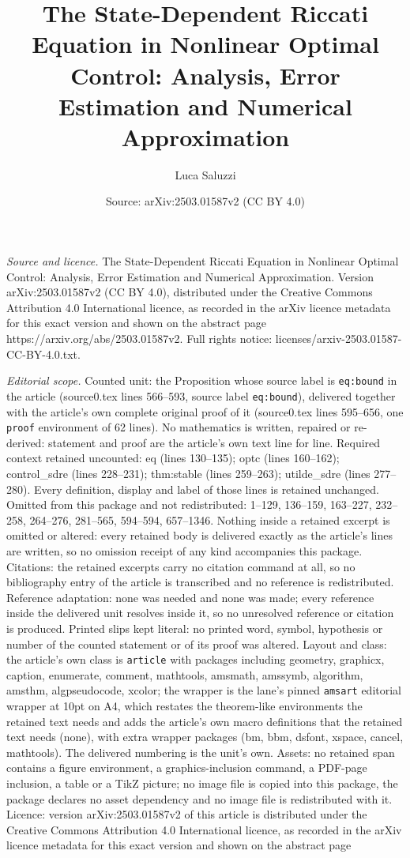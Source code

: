 \documentclass[10pt,a4paper]{amsart}
\title[The State-Dependent Riccati Equation in Nonlinear Optimal Co]{The State-Dependent Riccati Equation in Nonlinear Optimal Control: Analysis, Error Estimation and Numerical Approximation}
\author{Luca Saluzzi}
\date{Source: arXiv:2503.01587v2 (CC BY 4.0)}
\begin{document}
\maketitle

\noindent\emph{Source and licence.} The State-Dependent Riccati Equation in Nonlinear Optimal Control: Analysis, Error Estimation and Numerical Approximation. Version arXiv:2503.01587v2 (CC BY 4.0), distributed under the Creative Commons Attribution 4.0 International licence, as recorded in the arXiv licence metadata for this exact version and shown on the abstract page https://arxiv.org/abs/2503.01587v2. Full rights notice: licenses/arxiv-2503.01587-CC-BY-4.0.txt.\par\smallskip

\noindent\textit{Editorial scope.} Counted unit: the Proposition whose source label is \texttt{eq:bound} in the article (source0.tex lines 566--593, source label \texttt{eq:bound}), delivered together with the article's own complete original proof of it (source0.tex lines 595--656, one \texttt{proof} environment of 62 lines). No mathematics is written, repaired or re-derived: statement and proof are the article's own text line for line. Required context retained uncounted: eq (lines 130--135); optc (lines 160--162); control\_sdre (lines 228--231); thm:stable (lines 259--263); utilde\_sdre (lines 277--280). Every definition, display and label of those lines is retained unchanged. Omitted from this package and not redistributed: 1--129, 136--159, 163--227, 232--258, 264--276, 281--565, 594--594, 657--1346. Nothing inside a retained excerpt is omitted or altered: every retained body is delivered exactly as the article's lines are written, so no omission receipt of any kind accompanies this package. Citations: the retained excerpts carry no citation command at all, so no bibliography entry of the article is transcribed and no reference is redistributed. Reference adaptation: none was needed and none was made; every reference inside the delivered unit resolves inside it, so no unresolved reference or citation is produced. Printed slips kept literal: no printed word, symbol, hypothesis or number of the counted statement or of its proof was altered. Layout and class: the article's own class is \texttt{article} with packages including geometry, graphicx, caption, enumerate, comment, mathtools, amsmath, amssymb, algorithm, amsthm, algpseudocode, xcolor; the wrapper is the lane's pinned \texttt{amsart} editorial wrapper at 10pt on A4, which restates the theorem-like environments the retained text needs and adds the article's own macro definitions that the retained text needs (none), with extra wrapper packages (bm, bbm, dsfont, xspace, cancel, mathtools). The delivered numbering is the unit's own. Assets: no retained span contains a figure environment, a graphics-inclusion command, a PDF-page inclusion, a table or a TikZ picture; no image file is copied into this package, the package declares no asset dependency and no image file is redistributed with it. Licence: version arXiv:2503.01587v2 of this article is distributed under the Creative Commons Attribution 4.0 International licence, as recorded in the arXiv licence metadata for this exact version and shown on the abstract page 
\end{document}
